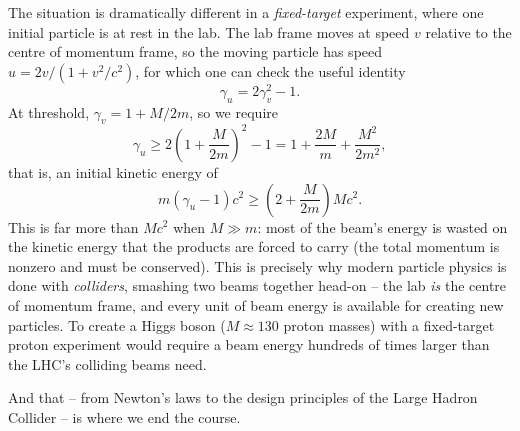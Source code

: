 \documentclass[a4paper]{scrartcl}
\begin{document}
The situation is dramatically different in a \emph{fixed-target} experiment, where one initial particle is at rest in the lab. The lab frame moves at speed $v$ relative to the centre of momentum frame, so the moving particle has speed $u = 2v/(1 + v^2/c^2)$, for which one can check the useful identity
$$
\gamma_u = 2\gamma_v^2 - 1.
$$
At threshold, $\gamma_v = 1 + M/2m$, so we require
$$
\gamma_u \geq 2\left(1 + \frac{M}{2m}\right)^2 - 1 = 1 + \frac{2M}{m} + \frac{M^2}{2m^2},
$$
that is, an initial kinetic energy of
$$
m(\gamma_u - 1)c^2 \geq \left(2 + \frac{M}{2m}\right)Mc^2.
$$
This is far more than $Mc^2$ when $M \gg m$: most of the beam's energy is wasted on the kinetic energy that the products are forced to carry (the total momentum is nonzero and must be conserved). This is precisely why modern particle physics is done with \emph{colliders}, smashing two beams together head-on -- the lab \emph{is} the centre of momentum frame, and every unit of beam energy is available for creating new particles. To create a Higgs boson ($M \approx 130$ proton masses) with a fixed-target proton experiment would require a beam energy hundreds of times larger than the LHC's colliding beams need.

And that -- from Newton's laws to the design principles of the Large Hadron Collider -- is where we end the course.
\end{document}
